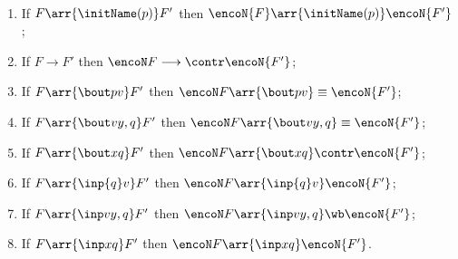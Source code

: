 \begin{lemma}
\label{l:opcorrCON_cbn}
$ $ \begin{enumerate}

\item {}  If $F \arr{\initName (p)} F'$ then 
$\encoN{F } \arr  {\initName (p)}  
 \encoN{F'}$ ; 


\item  {} If $F \longrightarrow F'$ then 
$ \encoN F \longrightarrow  \contr \encoN {F'}$; 

\item  {} If $F \arr{\bout pv} F'$ then 
$ \encoN F \arr{\bout pv}  \equiv  \encoN {F'}$; 
\item  {} If $F \arr{\bout v {y,q}} F'$ then 
$ \encoN F \arr{\bout v {y,q}}   \equiv  \encoN {F'}$; 
\item  {} If $F \arr{\bout x {q}} F'$ then 
$ \encoN F \arr{\bout x {q}}  \contr  \encoN {F'}$; 
\item  {} If $F \arr{\inp  {q} v} F'$ then 
$ \encoN F\arr{\inp  {q} v}    \encoN {F'}$; 
\item  {} If $F \arr{\inp   v{y,q}} F'$ then 
$ \encoN F\arr{\inp   v{y,q}}  \wb  \encoN {F'}$; 
\item  {} If $F \arr{\inp   x{q}} F'$ then 
$ \encoN F\arr{\inp   x{q}}    \encoN {F'}$.
\end{enumerate}
\end{lemma} 







